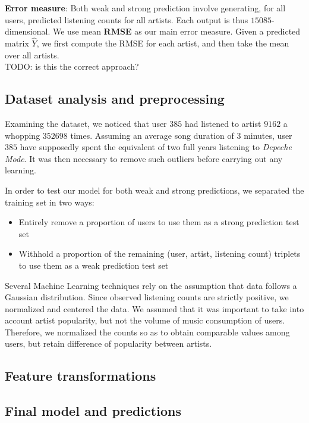 \documentclass{article}
\begin{document}
  \textbf{Error measure}: Both weak and strong prediction involve generating, for all users, predicted listening counts for all artists. Each output is thus $15085$-dimensional. We use mean \textbf{RMSE} as our main error measure. Given a predicted matrix $\hat{Y}$, we first compute the RMSE for each artist, and then take the mean over all artists.\\
  TODO: is this the correct approach?

  \subsection{Dataset analysis and preprocessing}
  Examining the dataset, we noticed that user $385$ had listened to artist $9162$ a whopping $352698$ times. Assuming an average song duration of $3$ minutes, user $385$ have supposedly spent the equivalent of two full years listening to \textit{Depeche Mode}. It was then necessary to remove such outliers before carrying out any learning.

  In order to test our model for both weak and strong predictions, we separated the training set in two ways:

  \begin{itemize}
    \item Entirely remove a proportion of users to use them as a strong prediction test set
    \item Withhold a proportion of the remaining (user, artist, listening count) triplets to use them as a weak prediction test set
  \end{itemize}

  Several Machine Learning techniques rely on the assumption that data follows a Gaussian distribution. Since observed listening counts are strictly positive, we normalized and centered the data. We assumed that it was important to take into account artist popularity, but not the volume of music consumption of users. Therefore, we normalized the counts so as to obtain comparable values among users, but retain difference of popularity between artists.

  \subsection{Feature transformations}

  \subsection{Final model and predictions}
\end{document}
